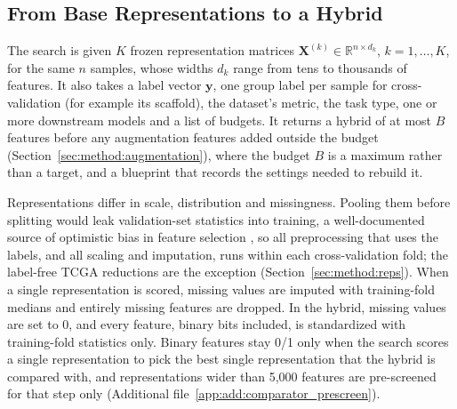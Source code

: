 

\subsection{From Base Representations to a Hybrid}\label{sec:method:build}


The search is given $K$ frozen representation matrices $\mathbf{X}^{(k)} \in \mathbb{R}^{n\times d_k}$, $k = 1, \dots, K$, for the same $n$ samples, whose widths $d_k$ range from tens to thousands of features. It also takes a label vector $\mathbf{y}$, one group label per sample for cross-validation (for example its scaffold), the dataset's metric, the task type, one or more downstream models and a list of budgets. It returns a hybrid of at most $B$ features before any augmentation features added outside the budget (Section~\ref{sec:method:augmentation}), where the budget $B$ is a maximum rather than a target, and a blueprint that records the settings needed to rebuild it.


Representations differ in scale, distribution and missingness. Pooling them before splitting would leak validation-set statistics into training, a well-documented source of optimistic bias in feature selection \citep{Ambroise2002, Vabalas2019}, so all preprocessing that uses the labels, and all scaling and imputation, runs within each cross-validation fold; the label-free TCGA reductions are the exception (Section~\ref{sec:method:reps}). When a single representation is scored, missing values are imputed with training-fold medians and entirely missing features are dropped. In the hybrid, missing values are set to 0, and every feature, binary bits included, is standardized with training-fold statistics only. Binary features stay 0/1 only when the search scores a single representation to pick the best single representation that the hybrid is compared with, and representations wider than 5,000 features are pre-screened for that step only (Additional file~\ref{app:add:comparator_prescreen}).

